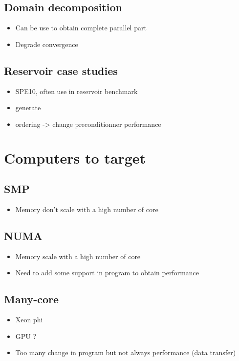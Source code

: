 \documentclass[oneside,12t]{classes/Thesis}
\begin{document}
\subsection{Domain decomposition}
  \begin{itemize}
    \item Can be use to obtain complete parallel part
    \item Degrade convergence
  \end{itemize}
\subsection{Reservoir case studies}
  \begin{itemize}
    \item SPE10, often use in reservoir benchmark
    \item generate
    \item ordering -> change preconditionner performance
  \end{itemize}



\section{Computers to target}
\subsection{SMP}
  \begin{itemize}
    \item Memory don't scale with a high number of core
  \end{itemize}
\subsection{NUMA}
  \begin{itemize}
    \item Memory scale with a high number of core
    \item Need to add some support in program to obtain performance
  \end{itemize}
\subsection{Many-core}
  \begin{itemize}
    \item Xeon phi
    \item GPU ?
    \item Too many change in program but not always performance (data transfer)
  \end{itemize}
\end{document}

